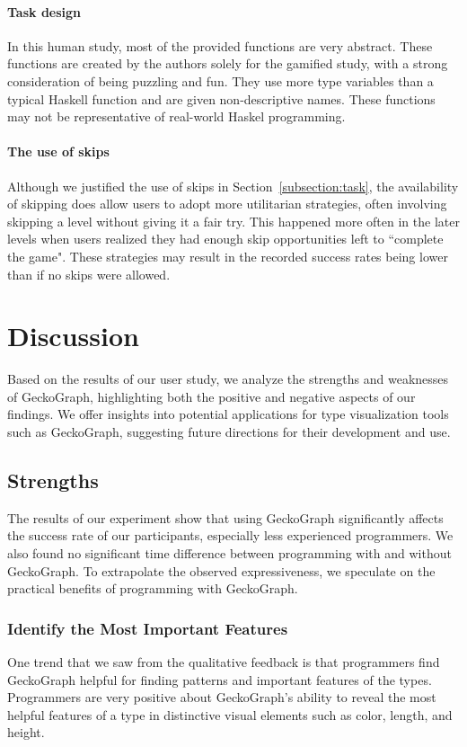\paragraph{Task design}
In this human study, most of the provided functions are very abstract. These functions are created by the authors solely for the gamified study, with a strong consideration of being puzzling and fun. They use more type variables than a typical Haskell function and are given non-descriptive names. These functions may not be representative of real-world Haskel programming. 


\paragraph{The use of skips}
Although we justified the use of skips in Section~\ref{subsection:task}, the availability of skipping does allow users to adopt more utilitarian strategies, often involving skipping a level without giving it a fair try. This happened more often in the later levels when users realized they had enough skip opportunities left to ``complete the game". These strategies may result in the recorded success rates being lower than if no skips were allowed.



\section{Discussion} 
Based on the results of our user study, we analyze the strengths and weaknesses of GeckoGraph, highlighting both the positive and negative aspects of our findings. We offer insights into potential applications for type visualization tools such as GeckoGraph, suggesting future directions for their development and use.


\label{sec:gecko-discussion}
\subsection{Strengths}
The results of our experiment show that using GeckoGraph significantly affects the success rate of our participants, especially less experienced programmers. We also found no significant time difference between programming with and without GeckoGraph. To extrapolate the observed expressiveness, we speculate on the practical benefits of programming with GeckoGraph.

\subsubsection{Identify the Most Important Features}
One trend that we saw from the qualitative feedback is that programmers find GeckoGraph helpful for finding patterns and important features of the types. Programmers are very positive about GeckoGraph's ability to reveal the most helpful features of a type in distinctive visual elements such as color, length, and height.

